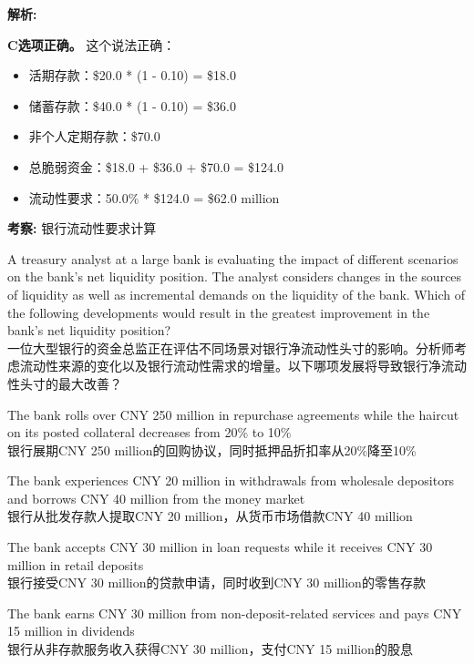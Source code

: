 \documentclass{article}
\newcounter{question} %
\newenvironment{explanation}
{\textbf{解析:}\par}
{\par}
\newcommand{\checklist}[1]{
    \textbf{考察:} #1 \par %
    \addcontentsline{toc}{subsection}{题号\thequestion 考察: #1} %
    \vspace{2em} %
}
\begin{document}
\begin{explanation}
   

    \textbf{C选项正确。}
    这个说法正确：
    \begin{itemize}
        \item 活期存款：\$20.0 * (1 - 0.10) = \$18.0
        \item 储蓄存款：\$40.0 * (1 - 0.10) = \$36.0
        \item 非个人定期存款：\$70.0
        \item 总脆弱资金：\$18.0 + \$36.0 + \$70.0 = \$124.0
        \item 流动性要求：50.0\% * \$124.0 = \$62.0 million
    \end{itemize}

   
\end{explanation}

\checklist{银行流动性要求计算}


\begin{question}
    A treasury analyst at a large bank is evaluating the impact of different scenarios on the bank's net liquidity position. The analyst considers changes in the sources of liquidity as well as incremental demands on the liquidity of the bank. Which of the following developments would result in the greatest improvement in the bank's net liquidity position?
    \\ 一位大型银行的资金总监正在评估不同场景对银行净流动性头寸的影响。分析师考虑流动性来源的变化以及银行流动性需求的增量。以下哪项发展将导致银行净流动性头寸的最大改善？
\end{question}

\begin{choices}
    \item The bank rolls over CNY 250 million in repurchase agreements while the haircut on its posted collateral decreases from 20\% to 10\%\\
    银行展期CNY 250 million的回购协议，同时抵押品折扣率从20\%降至10\%
    \item The bank experiences CNY 20 million in withdrawals from wholesale depositors and borrows CNY 40 million from the money market\\
    银行从批发存款人提取CNY 20 million，从货币市场借款CNY 40 million
    \item The bank accepts CNY 30 million in loan requests while it receives CNY 30 million in retail deposits\\
    银行接受CNY 30 million的贷款申请，同时收到CNY 30 million的零售存款
    \item The bank earns CNY 30 million from non-deposit-related services and pays CNY 15 million in dividends\\
    银行从非存款服务收入获得CNY 30 million，支付CNY 15 million的股息
\end{choices}
\end{document}
